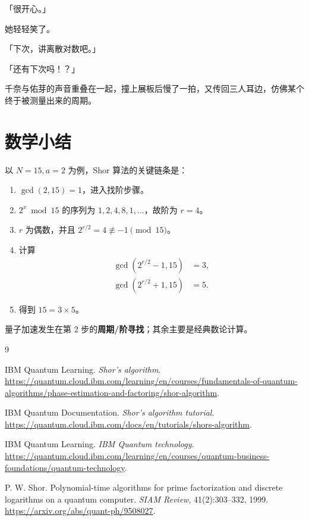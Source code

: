 「很开心。」

她轻轻笑了。

「下次，讲离散对数吧。」

「还有下次吗！？」

千奈与佑芽的声音重叠在一起，撞上展板后慢了一拍，又传回三人耳边，仿佛某个终于被测量出来的周期。

\section{数学小结}

以 $N=15,a=2$ 为例，Shor 算法的关键链条是：

\begin{enumerate}[leftmargin=2.4em]
  \item $\gcd(2,15)=1$，进入找阶步骤。
  \item $2^x\bmod15$ 的序列为 $1,2,4,8,1,\ldots$，故阶为 $r=4$。
  \item $r$ 为偶数，并且 $2^{r/2}=4\not\equiv-1\pmod{15}$。
  \item 计算
  \begin{align*}
    \gcd(2^{r/2}-1,15)&=3,\\
    \gcd(2^{r/2}+1,15)&=5.
  \end{align*}
  \item 得到 $15=3\times5$。
\end{enumerate}

量子加速发生在第 2 步的\textbf{周期/阶寻找}；其余主要是经典数论计算。

\begin{thebibliography}{9}

IBM Quantum Learning. \emph{Shor's algorithm}.
\url{https://quantum.cloud.ibm.com/learning/en/courses/fundamentals-of-quantum-algorithms/phase-estimation-and-factoring/shor-algorithm}.

IBM Quantum Documentation. \emph{Shor's algorithm tutorial}.
\url{https://quantum.cloud.ibm.com/docs/en/tutorials/shors-algorithm}.

IBM Quantum Learning. \emph{IBM Quantum technology}.
\url{https://quantum.cloud.ibm.com/learning/en/courses/quantum-business-foundations/quantum-technology}.

P. W. Shor. Polynomial-time algorithms for prime factorization and discrete logarithms on a quantum computer.
\emph{SIAM Review}, 41(2):303--332, 1999.
\url{https://arxiv.org/abs/quant-ph/9508027}.

\end{thebibliography}
